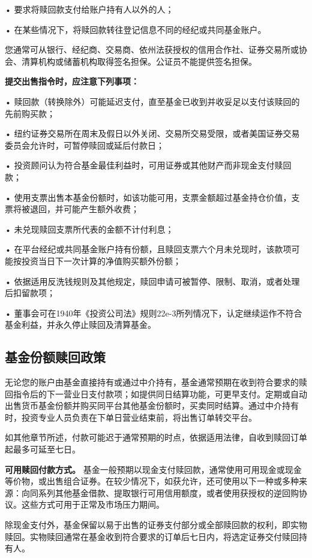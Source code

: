 \documentclass[UTF8,fontset=none,11pt,a4paper]{ctexart}
\begin{document}
• 要求将赎回款支付给账户持有人以外的人；


• 在某些情况下，将赎回款转往登记信息不同的经纪或共同基金账户。


您通常可从银行、经纪商、交易商、依州法获授权的信用合作社、证券交易所或协会、清算机构或储蓄机构取得签名担保。公证员不能提供签名担保。


\textbf{提交出售指令时，应注意下列事项：}


• 赎回款（转换除外）可能延迟支付，直至基金已收到并收妥足以支付该赎回的先前购买款；


• 纽约证券交易所在周末及假日以外关闭、交易所交易受限，或者美国证券交易委员会允许时，可暂停赎回或延后付款日；


• 投资顾问认为符合基金最佳利益时，可用证券或其他财产而非现金支付赎回款；


• 使用支票出售本基金份额时，如该功能可用，支票金额超过基金持仓价值，支票将被退回，并可能产生额外收费；


• 未兑现赎回支票所代表的金额不计付利息；


• 在平台经纪或共同基金账户持有份额，且赎回支票六个月未兑现时，该款项可能按投资当日下一次计算的净值购买额外份额；


• 依据适用反洗钱规则及其他规定，赎回申请可被暂停、限制、取消，或者处理后扣留款项；


• 董事会可在1940年《投资公司法》规则22e-3所列情况下，认定继续运作不符合基金利益，并永久停止赎回及清算基金。


\subsection*{基金份额赎回政策}
无论您的账户由基金直接持有或通过中介持有，基金通常预期在收到符合要求的赎回指令后的下一营业日支付款项；如提供同日结算功能，可更早支付。定期或自动出售货币基金份额并购买同平台其他基金份额时，买卖同时结算。通过中介持有时，投资专业人员负责在下单日营业结束前，将出售订单转交平台。


如其他章节所述，付款可能迟于通常预期的时点，依据适用法律，自收到赎回订单起最多可延至七日。


\textbf{可用赎回付款方式。} 基金一般预期以现金支付赎回款，通常使用可用现金或现金等价物，或出售组合证券。在较少情况下，如获允许，还可使用以下一种或多种来源：向同系列其他基金借款、提取银行可用信用额度，或者使用获授权的逆回购协议。这些方式可用于正常及市场压力期间。


除现金支付外，基金保留以易于出售的证券支付部分或全部赎回款的权利，即实物赎回。实物赎回通常在基金收到符合要求的订单后七日内，将选定证券交付赎回持有人。
\end{document}
